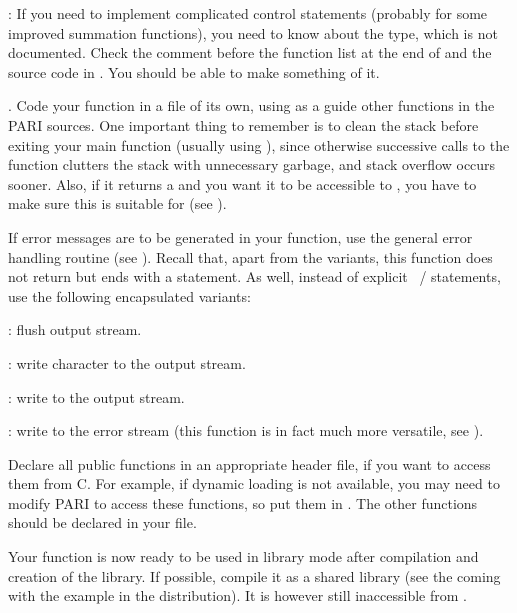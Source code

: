 : If you need to implement complicated control statements
(probably for some improved summation functions), you need to know about the
 type, which is not documented. Check the comment before the
function list at the end of  and the source code in
. You should be able to make something of it.
\smallskip

.
\noindent
Code your function in a file of its own, using as a guide other functions
in the PARI sources. One important thing to remember is to clean the stack
before exiting your main function (usually using ), since
otherwise successive calls to the function clutters the stack with
unnecessary garbage, and stack overflow occurs sooner. Also, if it
returns a  and you want it to be accessible to , you have to
make sure this  is suitable for  (see
).

If error messages are to be generated in your function, use the general
error handling routine  (see ). Recall that, apart
from the  variants, this function does not return but ends with
a  statement. As well, instead of explicit ~/
 statements, use the following encapsulated variants:

: flush output stream.

: write character  to the output stream.

: write  to the output stream.

: write  to the error stream
(this function is in fact much more versatile, see ).

Declare all public functions in an appropriate header file, if you
want to access them from C. For example, if dynamic
loading is not available, you may need to modify PARI to access these
functions, so put them in . The other functions should
be declared  in your file.

Your function is now ready to be used in library mode after compilation and
creation of the library. If possible, compile it as a shared library (see
the  coming with the  example in the
distribution). It is however still inaccessible from .\smallskip


